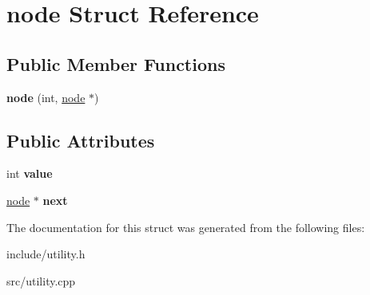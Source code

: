 \hypertarget{structnode}{\section{node \-Struct \-Reference}
\label{d5/da1/structnode}
}
\subsection*{\-Public \-Member \-Functions}
\begin{DoxyCompactItemize}
\item 
\hypertarget{structnode_adfa3f8fbe3258d320f76c2c1065551de}{{\bfseries node} (int, \hyperlink{structnode}{node} $\ast$)}\label{d5/da1/structnode_adfa3f8fbe3258d320f76c2c1065551de}

\end{DoxyCompactItemize}
\subsection*{\-Public \-Attributes}
\begin{DoxyCompactItemize}
\item 
\hypertarget{structnode_a1df258d4663fc36cfd0d5d93588aa21f}{int {\bfseries value}}\label{d5/da1/structnode_a1df258d4663fc36cfd0d5d93588aa21f}

\item 
\hypertarget{structnode_aad210fa7c160a49f6b9a3ffee592a2bc}{\hyperlink{structnode}{node} $\ast$ {\bfseries next}}\label{d5/da1/structnode_aad210fa7c160a49f6b9a3ffee592a2bc}

\end{DoxyCompactItemize}


\-The documentation for this struct was generated from the following files\-:\begin{DoxyCompactItemize}
\item 
include/utility.\-h\item 
src/utility.\-cpp\end{DoxyCompactItemize}

